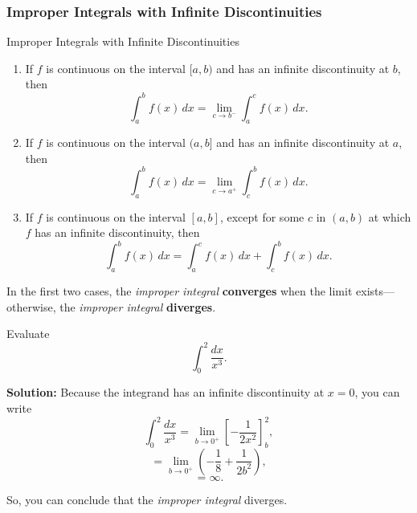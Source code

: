 \documentclass[12pt]{article}
\theoremstyle{beautifulthm}
\begin{document}
\newpage

\subsubsection{Improper Integrals with Infinite Discontinuities}
\begin{Definition}{Improper Integrals with Infinite Discontinuities}{}
    \begin{enumerate}
    \item If $f$ is continuous on the interval $[a, b)$ and has an infinite discontinuity at $b$, then
    \[
    \int_a^b f(x) \, dx = \lim_{c \to b^-} \int_a^c f(x) \, dx.
    \]

    \item If $f$ is continuous on the interval $(a, b]$ and has an infinite discontinuity at $a$, then
    \[
    \int_a^b f(x) \, dx = \lim_{c \to a^+} \int_c^b f(x) \, dx.
    \]

    \item If $f$ is continuous on the interval $[a, b]$, except for some $c$ in $(a, b)$ at which $f$ has an infinite discontinuity, then
    \[
    \int_a^b f(x) \, dx = \int_a^c f(x) \, dx + \int_c^b f(x) \, dx.
    \]
\end{enumerate}

In the first two cases, the \textit{improper integral} \textbf{converges} when the limit exists—otherwise, the \textit{improper integral} \textbf{diverges}.
\end{Definition}

\begin{tcolorbox}[colback=examplebg, colframe=red!75!black, title=\textbf{EXAMPLE 3: An Improper Integral That Diverges}, fonttitle=\bfseries, sharp corners]
Evaluate
\[
\int_0^2 \frac{dx}{x^3}.
\]



\tcblower
\textbf{Solution:} 
Because the integrand has an infinite discontinuity at $x = 0$, you can write
\[
\int_0^2 \frac{dx}{x^3} = \lim_{b \to 0^+} \left[ -\frac{1}{2x^2} \right]_b^2,
\]
\[
= \lim_{b \to 0^+} \left( -\frac{1}{8} + \frac{1}{2b^2} \right),
\]
\[
= \infty.
\]

So, you can conclude that the \textit{improper integral} diverges.
\end{tcolorbox}
\end{document}
